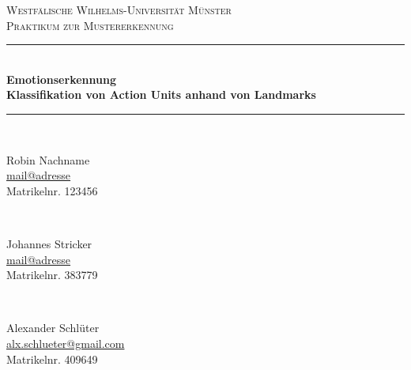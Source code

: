 


\date{16. September 2016}
\begin{titlepage}
	\newcommand{\HRule}{\rule{\linewidth}{0.5mm}} %

	\center %
 

	\textsc{\LARGE Westfälische Wilhelms-Universität Münster}\\[1.5cm] %
	\textsc{\Large Praktikum zur Mustererkennung}\\[0.5cm] %


	\HRule \\[0.4cm]
	
	{\onehalfspacing\huge\sffamily\bfseries Emotionserkennung \\[0.4cm]
    \large Klassifikation von Action Units anhand von Landmarks \singlespacing} %
	\vspace{0.4cm}
	\HRule \\[3cm] 
	
	\begin{minipage}[t]{0.3\textwidth}
	\begin{center} \large
	Robin Nachname\\ %
	\normalsize \url{mail@adresse}\\
	Matrikelnr. 123456
	\end{center}
	\end{minipage}
	~
	\begin{minipage}[t]{0.3\textwidth}
	\begin{center} \large
	Johannes Stricker\\ 
	\normalsize \url{mail@adresse}\\
	Matrikelnr. 383779
	\end{center}
	\end{minipage}
  ~
	\begin{minipage}[t]{0.3\textwidth}
	\begin{center} \large
	Alexander Schlüter\\ 
	\normalsize \url{alx.schlueter@gmail.com}\\
	Matrikelnr. 409649
	\end{center}
  \end{minipage}


\end{titlepage}
